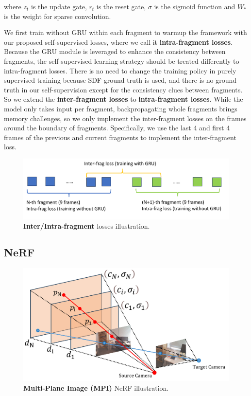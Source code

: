 \noindent where $z_t$ is the update gate, $r_t$ is the reset gate, $\sigma$ is the sigmoid function and $W_{*}$ is the weight for sparse convolution. 






We first train without GRU within each fragment to warmup the framework with our proposed self-supervised losses, where we call it \textbf{intra-fragment losses}. Because the GRU module is leveraged to enhance the consistency between fragments, the self-supervised learning strategy should be treated differently to intra-fragment losses. There is no need to change the training policy in purely supervised training because SDF ground truth is used, and there is no ground truth in our self-supervision except for the consistency clues between fragments. So we extend the \textbf{inter-fragment losses} to \textbf{intra-fragment losses}. While the model only takes input per fragment, backpropagating whole fragments brings memory challenges, so we only implement the inter-fragment losses on the frames around the boundary of fragments. Specifically, we use the last 4 and first 4 frames of the previous and current fragments to implement the inter-fragment loss.

\begin{figure}
    \includegraphics[width=\linewidth]{figures/GRUloss_explain.png}
    \caption{\textbf{Inter/Intra-fragment} losses illustration.}
    \label{fig:gruloss_explain}
\end{figure}


\subsection{NeRF}

\begin{figure}
    \includegraphics[width=\linewidth]{figures/MPI_explain.png}
    \caption{\textbf{Multi-Plane Image (MPI)} NeRF illustration.}
    \label{fig:mpi_explain}
\end{figure}


